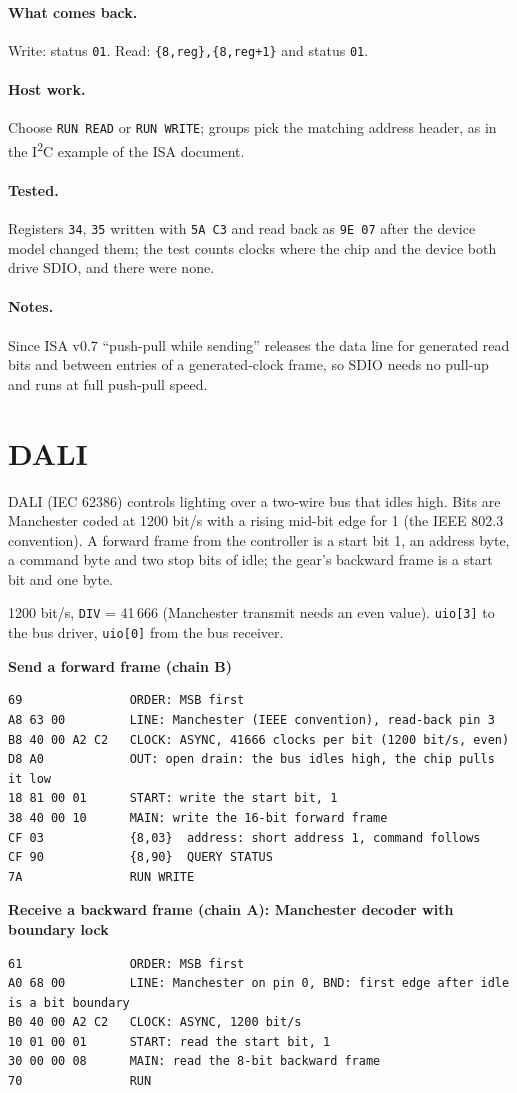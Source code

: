 \documentclass[11pt,a4paper]{article}
\newcommand{\sig}[1]{\texttt{#1}}
\newcommand{\progtitle}[1]{\par\smallskip\textbf{\small\color{accent}#1}\par\nopagebreak}
\newcommand{\facts}[1]{\par\noindent\colorbox{codebg}{\parbox{\dimexpr\linewidth-2\fboxsep}{\small #1}}\par}
\begin{document}
\paragraph{What comes back.} Write: status \texttt{01}. Read: \texttt{\{8,reg\},\{8,reg+1\}} and status \texttt{01}.

\paragraph{Host work.} Choose \sig{RUN READ} or \sig{RUN WRITE}; groups pick the matching address header, as in the I\textsuperscript{2}C example of the ISA document.

\paragraph{Tested.} Registers \texttt{34}, \texttt{35} written with \texttt{5A C3} and read back as \texttt{9E 07} after the device model changed them; the test counts clocks where the chip and the device both drive SDIO, and there were none.
\paragraph{Notes.} Since ISA v0.7 ``push-pull while sending'' releases the data line for generated read bits and between entries of a generated-clock frame, so SDIO needs no pull-up and runs at full push-pull speed.
\section{DALI}
DALI (IEC 62386) controls lighting over a two-wire bus that idles high. Bits are Manchester coded at 1200 bit/s with a rising mid-bit edge for 1 (the IEEE 802.3 convention). A forward frame from the controller is a start bit 1, an address byte, a command byte and two stop bits of idle; the gear's backward frame is a start bit and one byte.
\facts{1200 bit/s, \sig{DIV} = 41\,666 (Manchester transmit needs an even value). \sig{uio[3]} to the bus driver, \sig{uio[0]} from the bus receiver.}
\progtitle{Send a forward frame (chain B)}
\begin{lstlisting}
69               ORDER: MSB first
A8 63 00         LINE: Manchester (IEEE convention), read-back pin 3
B8 40 00 A2 C2   CLOCK: ASYNC, 41666 clocks per bit (1200 bit/s, even)
D8 A0            OUT: open drain: the bus idles high, the chip pulls it low
18 81 00 01      START: write the start bit, 1
38 40 00 10      MAIN: write the 16-bit forward frame
CF 03            {8,03}  address: short address 1, command follows
CF 90            {8,90}  QUERY STATUS
7A               RUN WRITE
\end{lstlisting}
\progtitle{Receive a backward frame (chain A): Manchester decoder with boundary lock}
\begin{lstlisting}
61               ORDER: MSB first
A0 68 00         LINE: Manchester on pin 0, BND: first edge after idle is a bit boundary
B0 40 00 A2 C2   CLOCK: ASYNC, 1200 bit/s
10 01 00 01      START: read the start bit, 1
30 00 00 08      MAIN: read the 8-bit backward frame
70               RUN
\end{lstlisting}
\end{document}
